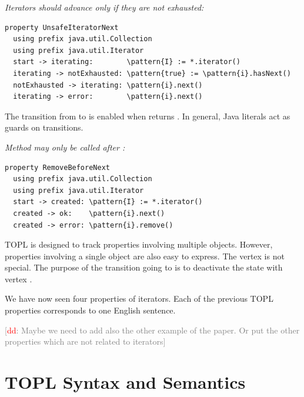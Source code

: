 \documentclass[10pt]{llncs} %
\newcommand{\noterg}[2]{\textcolor{gray}{[\textcolor{red}{#1}: #2]}}
\newcommand{\dd}[1]{\noterg{dd}{#1}}
\newcommand{\dinocomment}[1]{\dd{#1}}
\newcommand{\delimitVerbatim}{\par\nobreak\smallskip\noindent}
\newcommand{\pattern}[1]{\ensuremath{\mathtt{\underline{#1}}}}
\newcommand{\start}{\ensuremath{\mathtt{start}}\xspace}
\begin{document}
\medskip\emph{Iterators should advance only if they are not exhausted:}
\delimitVerbatim
\begin{Verbatim}[commandchars=\\\{\}]
property UnsafeIteratorNext
  using prefix java.util.Collection
  using prefix java.util.Iterator
  start -> iterating:        \pattern{I} := *.iterator()
  iterating -> notExhausted: \pattern{true} := \pattern{i}.hasNext()
  notExhausted -> iterating: \pattern{i}.next()
  iterating -> error:        \pattern{i}.next()
\end{Verbatim}
\delimitVerbatim
The transition from \Verb@iterating@ to \Verb@notExhausted@ is enabled when \Verb@hasNext@ returns \Verb@true@.
In general, Java literals act as guards on transitions.

\medskip\emph{Method \Verb@remove@ may only be called after \Verb@next@:}
\delimitVerbatim
\begin{Verbatim}[commandchars=\\\{\}]
property RemoveBeforeNext
  using prefix java.util.Collection
  using prefix java.util.Iterator
  start -> created: \pattern{I} := *.iterator()
  created -> ok:    \pattern{i}.next()
  created -> error: \pattern{i}.remove()
\end{Verbatim}
\delimitVerbatim
TOPL is designed to track properties involving multiple objects.
However, properties involving a single object are also easy to express.
The vertex \Verb@ok@ is not special.
The purpose of the transition going to \Verb@ok@ is to deactivate the state with vertex \Verb@created@.

\medskip
We have now seen four properties of iterators.
Each of the previous TOPL properties corresponds to one English sentence.

\dinocomment{Maybe we need to add also the other example of the paper. Or put the other properties which are not related to iterators}

\section{TOPL Syntax and Semantics}



\end{document}
